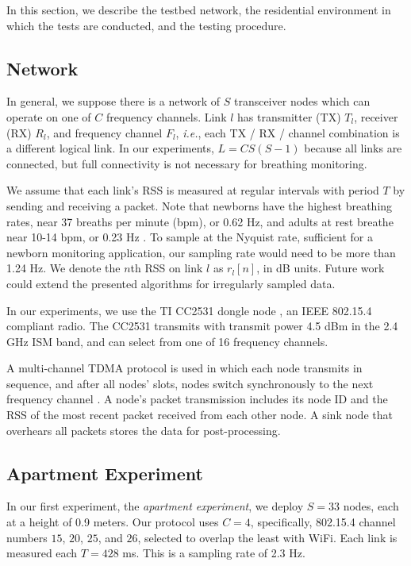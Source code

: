 \documentclass[10pt,journal,letterpaper]{IEEEtran}
\newcommand{\ie}{{\it i.e.}}
\begin{document}
In this section, we describe the testbed network, the residential environment in which the tests are conducted, and the testing procedure. 

\subsection{Network}



In general, we suppose there is a network of $S$ transceiver nodes which can operate on one of $C$ frequency channels.  Link $l$ has transmitter (TX) $T_l$, receiver (RX) $R_l$, and frequency channel $F_l$, \ie, each TX / RX / channel combination is a different logical link. In our experiments, $L=C S(S-1)$ because all links are connected, but full connectivity is not necessary for breathing monitoring.  

We assume that each link's RSS is measured at regular intervals with period $T$ by sending and receiving a packet.  Note that newborns have the highest breathing rates, near 37 breaths per minute (bpm), or 0.62 Hz, and adults at rest breathe near 10-14 bpm, or 0.23 Hz \cite{murray86}.  To sample at the Nyquist rate, sufficient for a newborn monitoring application, our sampling rate would need to be more than 1.24 Hz.  We denote the $n$th RSS on link $l$ as $r_l[n]$, in dB units.  Future work could extend the presented algorithms for irregularly sampled data.

In our experiments, we use the TI CC2531 dongle node \cite{tidongle}, an IEEE 802.15.4 compliant radio.  The CC2531 transmits with transmit power 4.5 dBm in the 2.4 GHz ISM band, and can select from one of 16 frequency channels.



A multi-channel TDMA protocol is used in which each node transmits in sequence, and after all nodes' slots, nodes switch synchronously to the next frequency channel \cite{kaltiokallio2012follow}.  A node's packet transmission includes its node ID and the RSS of the most recent packet received from each other node.  A sink node that overhears all packets stores the data for post-processing.

\subsection{Apartment Experiment}

In our first experiment, the \emph{apartment experiment}, we deploy $S=33$ nodes, each at a height of 0.9 meters.  Our protocol uses $C=4$, specifically, 802.15.4 channel numbers $15$, $20$, $25$, and $26$, selected to overlap the least with WiFi.  Each link is measured each $T=428$ ms.  This is a sampling rate of 2.3 Hz. 
\end{document}

